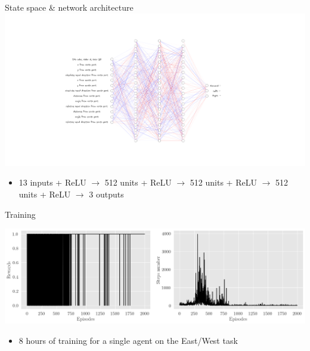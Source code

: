 \documentclass[bigger]{beamer}
\begin{document}
\begin{frame}[label={sec:org0338926}]{State space \& network architecture}
\centering
\includegraphics[width=\textwidth, trim=9cm 3cm 10cm 3cm, clip=true]{img/state-space-nn.png}
\tiny
\begin{itemize}
\item 13 inputs + ReLU \(\to\) 512 units  + ReLU \(\to\) 512 units  + ReLU \(\to\) 512 units  + ReLU \(\to\) 3 outputs
\end{itemize}
\end{frame}
\begin{frame}[label={sec:orgf9f5446}]{Training}
\begin{center}
\includegraphics[width=\textwidth]{img/steps-and-rewards.png}
\end{center}
\begin{itemize}
\item 8 hours of training for a single agent on the East/West task
\end{itemize}
\end{frame}
\end{document}
